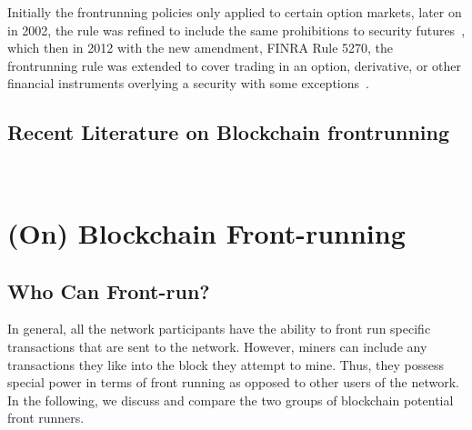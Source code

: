 Initially the frontrunning policies only applied to certain option markets, later on in 2002, the rule was refined to include the same prohibitions to security futures~\cite{finra_2002}, which then in 2012 with the new amendment, FINRA Rule 5270, the frontrunning rule was extended to cover trading in an option, derivative, or other financial instruments overlying a security with some exceptions~\cite{finra_2012, sec2012frontrunning}. 


\subsection{Recent Literature on Blockchain frontrunning}

~\cite{malinova2017market}
~\cite{aune2017footprints}
~\cite{breidenbach2018enter}






\section{(On) Blockchain Front-running}

\subsection{Who Can Front-run?}
\label{sec:who can frontrun?}

In general, all the network participants have the ability to front run specific transactions that are sent to the network. However, miners can include any transactions they like into the block they attempt to mine. Thus, they possess special power in terms of front running as opposed to other users of the network. In the following, we discuss and compare the two groups of blockchain potential front runners.

